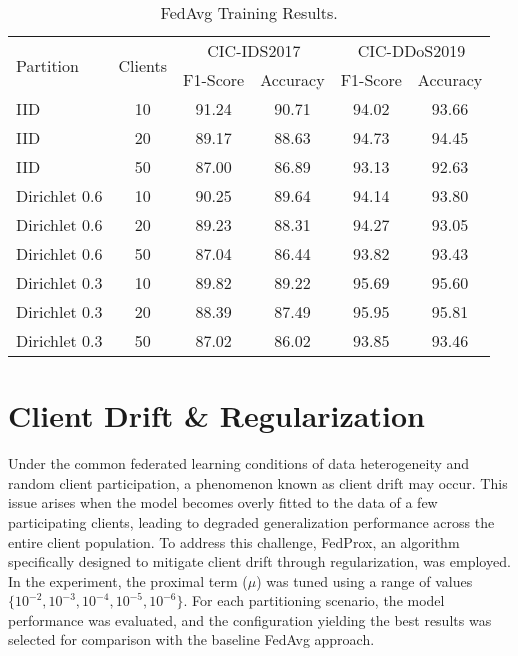 \begin{table}[h]
    \caption{FedAvg Training Results.}
    \centering
    \begin{tabular}{l|c|c|c|c|c}
        \multirow{2}{*}{Partition} & \multirow{2}{*}{Clients} & \multicolumn{2}{|c|}{CIC-IDS2017} & \multicolumn{2}{|c}{CIC-DDoS2019} \\
        \cline{3-6} & & F1-Score & Accuracy & F1-Score & Accuracy \\
        \hline\hline
        IID & 10 & 91.24 & 90.71 & 94.02 & 93.66 \\
        IID & 20 & 89.17 & 88.63 & 94.73 & 94.45 \\
        IID & 50 & 87.00 & 86.89 & 93.13 & 92.63 \\
        Dirichlet 0.6 & 10 & 90.25 & 89.64 & 94.14 & 93.80 \\
        Dirichlet 0.6 & 20 & 89.23 & 88.31 & 94.27 & 93.05 \\
        Dirichlet 0.6 & 50 & 87.04 & 86.44 & 93.82 & 93.43 \\
        Dirichlet 0.3 & 10 & 89.82 & 89.22 & 95.69 & 95.60 \\
        Dirichlet 0.3 & 20 & 88.39 & 87.49 & 95.95 & 95.81 \\
        Dirichlet 0.3 & 50 & 87.02 & 86.02 & 93.85 & 93.46 \\
    \end{tabular}
    \label{tbl:fedavg_results}
\end{table}


\section{Client Drift \& Regularization}

Under the common federated learning conditions of data heterogeneity and random client participation, a phenomenon known as client drift may occur. This issue arises when the model becomes overly fitted to the data of a few participating clients, leading to degraded generalization performance across the entire client population. To address this challenge, FedProx, an algorithm specifically designed to mitigate client drift through regularization, was employed. In the experiment, the proximal term ($\mu$) was tuned using a range of values $\{10^{-2}, 10^{-3}, 10^{-4}, 10^{-5}, 10^{-6}\}$. For each partitioning scenario, the model performance was evaluated, and the configuration yielding the best results was selected for comparison with the baseline FedAvg approach.

